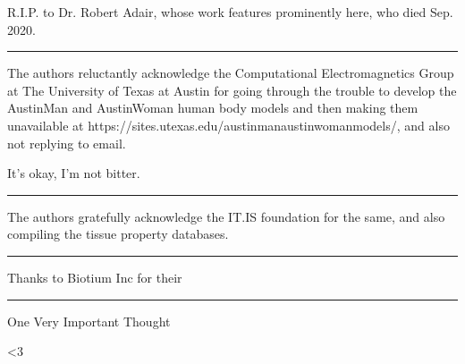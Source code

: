 \documentclass[paper.tex]{subfiles}
\begin{document}
R.I.P. to Dr. Robert Adair, whose work features prominently here, who died Sep. 2020. 


\rule{\linewidth}{0.2pt}

The authors reluctantly acknowledge the Computational Electromagnetics Group at The University of Texas at Austin for going through the trouble to develop the AustinMan and AustinWoman human body models and then making them unavailable at https://sites.utexas.edu/austinmanaustinwomanmodels/, and also not replying to email. 

It's okay, I'm not bitter.

\rule{\linewidth}{0.2pt}

The authors gratefully acknowledge the IT.IS foundation for the same, and also compiling the tissue property databases.

\rule{\linewidth}{0.2pt}

Thanks to Biotium Inc for their 

\rule{\linewidth}{0.2pt}

One Very Important Thought


{\Large {\verbatim <3}}
\end{document}
